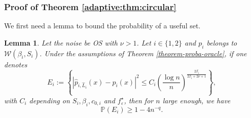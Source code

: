 \documentclass[11pt,a4paper,openany]{article}
\newtheorem{lem}[thm]{Lemma}
\begin{document}
\subsubsection{Proof of Theorem   \ref{adaptive:thm:circular} } \label{preuve-adaptive:thm:circular}
We first need a lemma to bound the probability of a useful set.
\begin{lem}\label{proba-hat-p}
Let the noise be OS with $\nu>1$. Let $ i \in \{1, 2\}$ and  $p_i$ belongs to $\mathcal{W}(\beta_i, S_i)$. Under the assumptions of Theorem \ref{theorem-proba-oracle}, 
 if one denotes 
$$
 E_i :=\left  \{ |\widehat p_{i, \hat L_i} (x) -p_i(x) |^2 \leq C_i  \left (\frac{\log n}{n} \right)^{\frac{2\beta_i}{2\beta_i + 2\nu +1}} \right \}, 
$$
with $C_i$ depending on $S_i, \beta_i, c_{0, i}$ and $f^\star_\varepsilon$, then for $n$ large enough, we have
$$
\mathbb{P}( E_i) \geq 1- 4n^{-q}.
$$

\end{lem}
\end{document}
